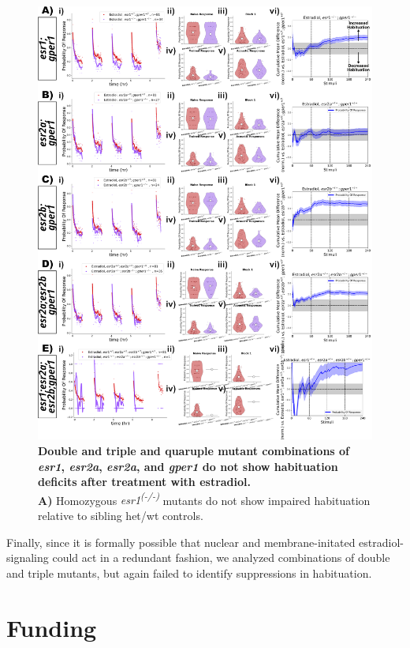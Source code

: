 \documentclass[9pt,lineno]{RandlettLab_elife}
\begin{document}
{\begin{figure}
\begin{fullwidth}
\begin{center}
\includegraphics[width=0.95\linewidth]{figures/gper1andNuclearMutants.png}
\caption{ \textbf{Double and triple and quaruple mutant combinations of \emph{esr1}, \emph{esr2a}, \emph{esr2a}, and \emph{gper1} do not show habituation deficits after treatment with estradiol.}
\\ \textbf{A)} Homozygous \emph{esr1\textsuperscript{(-/-)}} mutants do not show impaired habituation relative to sibling het/wt controls. 
}
\label{fig:5}
\end{center}
\end{fullwidth}
\end{figure}

Finally, since it is formally possible that nuclear and membrane-initated estradiol-signaling could act in a redundant fashion, we analyzed combinations of double and triple mutants, but again failed to identify suppressions in habituation. 

\section{Funding}

}
\end{document}
